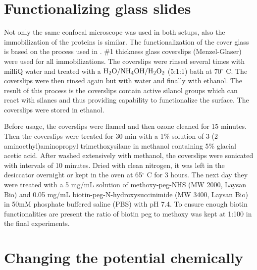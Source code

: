 \documentclass[twoside,single]{lion-msc}
\begin{document}
\section*{Functionalizing glass slides}
Not only the same confocal microscope was used in both setups, also the immobilization of the proteins is similar. The functionalization of the cover glass is based on the process used in \cite{Gupta2014}.  \diameter 25mm \#1 thickness glass coverslips (Menzel-Glaser) were used for all immobilizations. The coverslips were rinsed several times with milliQ water and treated with a  $\textup{H}_{2}\textup{O} / \textup{NH}_{4}\textup{OH} / \textup{H}_{2}\textup{O}_{2}$ (5:1:1) bath at 70$^{\circ}$ C. The coverslips were then rinsed again but with water and finally with ethanol. The result of this process is the coverslips contain active silanol groups which can react with silanes and thus providing capability to functionalize the surface. The coverslips were stored in ethanol.


Before usage, the coverslips were flamed and then ozone cleaned for 15 minutes. Then the coverslips were treated for 30 min with a 1\% solution of 3-(2-aminoethyl)aminopropyl trimethoxysilane in methanol containing 5\% glacial acetic acid. After washed extensively with methanol, the coverslips were sonicated with intervals of 10 minutes. Dried with clean nitrogen, it was left in the desiccator overnight or kept in the oven at 65$^{\circ}$ C for 3 hours. The next day they were treated with a 5 mg/mL solution of methoxy-peg-NHS (MW 2000, Laysan Bio) and 0.05 mg/mL biotin-peg-N-hydroxysuccinimide (MW 3400, Laysan Bio) in 50mM phosphate buffered saline (PBS)  with pH 7.4. To ensure enough biotin functionalities are present the ratio of biotin peg to methoxy was kept at 1:100 in the final experiments.  






\section{Changing the potential chemically}\label{pot_chem}
\end{document}
